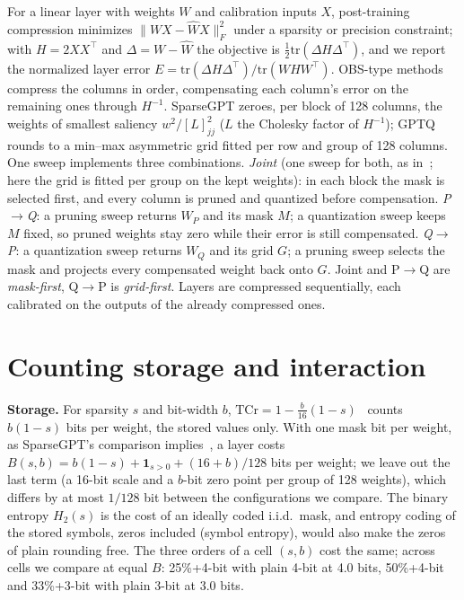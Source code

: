 \documentclass{esannV2}
\begin{document}
For a linear layer with weights $W$ and calibration inputs $X$, post-training
compression minimizes $\|WX-\widehat W X\|_F^2$ under a sparsity or precision
constraint; with $H=2XX^\top$ and $\Delta=W-\widehat W$ the objective is
$\frac12\mathrm{tr}(\Delta H\Delta^\top)$, and we report the normalized layer error
$E=\mathrm{tr}(\Delta H\Delta^\top)/\mathrm{tr}(WHW^\top)$. OBS-type methods
compress the columns in order, compensating each column's error on the
remaining ones through $H^{-1}$. SparseGPT zeroes, per block of 128
columns, the weights of smallest saliency $w^2/[L]_{jj}^2$ ($L$ the Cholesky
factor of $H^{-1}$); GPTQ rounds
to a min--max asymmetric grid fitted per row and group of 128 columns. One
sweep implements three combinations.
\emph{Joint} (one sweep for both, as
in~\cite{frantar2022obc,frantar2023sparsegpt,guo2026obr}; here the grid is
fitted per group on the kept weights): in each block the mask is selected
first, and every
column is pruned and quantized before compensation. \emph{P$\to$Q}: a pruning
sweep returns $W_P$ and its mask $M$; a quantization sweep keeps $M$ fixed, so
pruned weights stay zero while their error is still compensated.
\emph{Q$\to$P}: a quantization sweep returns $W_Q$ and its grid $G$; a pruning
sweep selects the mask and projects every compensated weight back onto $G$.
Joint and P$\to$Q are \emph{mask-first}, Q$\to$P is \emph{grid-first}. Layers
are compressed sequentially, each calibrated on the outputs of the already
compressed ones.

\section{Counting storage and interaction}
\label{sec:accounting}

\textbf{Storage.} For sparsity $s$ and bit-width $b$,
$\mathrm{TCr}=1-\frac{b}{16}(1-s)$~\cite{laborde2025semantic} counts
${b(1-s)}$ bits per weight, the stored values only. With one mask bit per
weight, as SparseGPT's comparison implies~\cite{frantar2023sparsegpt}, a layer
costs $B(s,b)={b(1-s)}+\mathbf{1}_{s>0}+{(16+b)/128}$ bits per weight; we
leave out the last term (a 16-bit scale and a $b$-bit zero point per group of
128 weights), which differs by at most $1/128$ bit between the configurations
we compare. The binary entropy $H_2(s)$ is the cost of an ideally coded
i.i.d.\ mask, and
entropy coding of the stored symbols, zeros included (symbol entropy), would
also make the zeros of plain rounding free. The three orders of a cell
$(s,b)$ cost the same; across cells we compare at equal $B$: 25\%+4-bit with
plain 4-bit at 4.0 bits, 50\%+4-bit and 33\%+3-bit with plain 3-bit at 3.0
bits.
\end{document}
